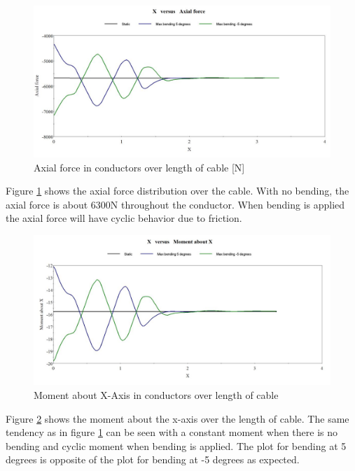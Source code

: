 \begin{figure}[H]
\centering
\includegraphics[scale=0.75]{figures/bflexax}
\caption[$\; \:$Axial force in conductors]{Axial force in conductors over length of cable [N]}
 \label{fig:bflexax}
\end{figure}
\noindent Figure \ref{fig:bflexax} shows the axial force distribution over the cable. With no bending, the axial force is about 6300N throughout the conductor. When bending is applied the axial force will have cyclic behavior due to friction.
\begin{figure}[H]
\centering
\includegraphics[scale=0.75]{figures/bflexmx}
\caption[$\; \:$Moment about X-Axis in conductors]{Moment about X-Axis in conductors over length of cable}
 \label{fig:bflexmx}
\end{figure}

\noindent Figure \ref{fig:bflexmx} shows the moment about the x-axis over the length of cable. The same tendency as in figure \ref{fig:bflexax} can be seen with a constant moment when there is no bending and cyclic moment when bending is applied. The plot for bending at 5 degrees is opposite of the plot for bending at -5 degrees as expected.  

